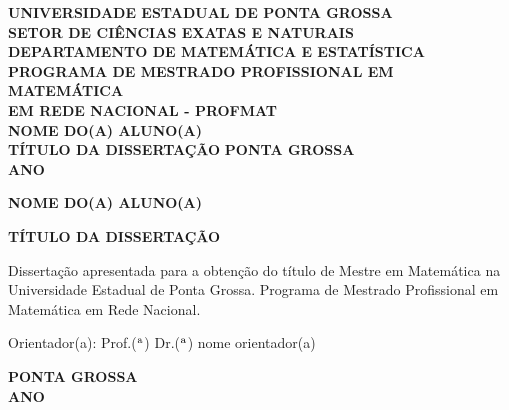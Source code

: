 \documentclass[a4paper,12pt]{report}%
\begin{document}
\onehalfspace
\pagestyle{plain}

%
%
\thispagestyle{empty}

\begin{center}
\textbf{{\normalsize UNIVERSIDADE ESTADUAL DE PONTA GROSSA}} \\
\textbf{{\normalsize SETOR DE CIÊNCIAS EXATAS E NATURAIS}} \\
\textbf{{\normalsize DEPARTAMENTO DE MATEMÁTICA E ESTATÍSTICA}}\\
\textbf{{\normalsize PROGRAMA DE MESTRADO PROFISSIONAL EM MATEMÁTICA \\ EM REDE NACIONAL - PROFMAT \\}}
\vspace{4.5cm}
\textbf{{\normalsize NOME DO(A) ALUNO(A) \\}}
\vspace{4.5cm}
\textbf{\textsf{\normalsize TÍTULO DA DISSERTAÇÃO}}
\vfill
\textbf{{\normalsize PONTA GROSSA}} \\
\textbf{{\normalsize ANO}}
\end{center}

\newpage

%
%

\thispagestyle{empty}

\begin{center}
\textbf{{\normalsize NOME DO(A) ALUNO(A)}}

\vfill
\textbf{\textsf{\normalsize TÍTULO DA DISSERTAÇÃO}}

\vspace{0.75cm}
\begin{flushright}
\begin{minipage}[t]{9cm}
{\small
Dissertação apresentada 
para a obtenção do título de Mestre em Matemática
na Universidade Estadual de Ponta Grossa.
Programa de Mestrado Profissional em Matemática em Rede Nacional.

\vspace{0.2cm}
Orientador(a): Prof.($^{\text a}$) Dr.($^{\text a}$) nome orientador(a)
}
\end{minipage}
\end{flushright}

\vfill
\textbf{{\normalsize PONTA GROSSA}} \\
\textbf{{\normalsize ANO}}
\end{center}
\end{document}
